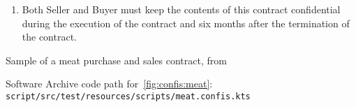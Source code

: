 \begin{table}[H]
{\begin{minipage}{0.8\textwidth}
\begin{enumerate}
                \begin{enumerate}
                    \item Both Seller and Buyer must keep the contents of this contract confidential during the execution of the contract and six months after the termination of the contract.
                \end{enumerate}
            \end{enumerate}
        \end{minipage}
    }
    \caption[Sample meat sales contract]{Sample of a meat purchase and sales contract, from~\cite{symboleo2020}}
    \label{tab:meat}
\end{table}

Software Archive code path for~\autoref{fig:confis:meat}:\\
\texttt{script/src/test/resources/scripts/meat.confis.kts}


